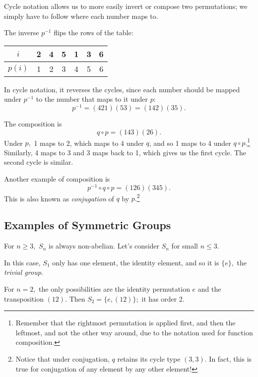 Cycle notation allows us to more easily invert or compose two permutations; we simply have to follow where each number maps to.

\begin{example}[Inversion]
The inverse $p^{-1}$ flips the rows of the table:
\begin{center}
    \begin{tabular}{c|c c c c c c}
     $i$ & 2 & 4 & 5 & 1 & 3 & 6 \\
     \hline
     $p(i)$ & 1 & 2 & 3 & 4 & 5 & 6
\end{tabular}
\end{center}

In cycle notation, it reverses the cycles, since each number should be mapped under $p^{-1}$ to the number that maps to it under $p$:
\[
p^{-1} = (421)(53) = (142)(35).
\]
\end{example}

\begin{example}[Composition]
The composition is
\[
q \circ p = (143)(26).
\]
Under $p,$ 1 maps to 2, which maps to 4 under $q$, and so 1 maps to 4 under $q \circ p.$\footnote{Remember that the rightmost permutation is applied first, and then the leftmost, and not the other way around, due to the notation used for function composition.} Similarly, 4 maps to 3 and 3 maps back to 1, which gives us the first cycle. The second cycle is similar.
\end{example}

\begin{example}[Conjugation]
Another example of composition is
\[
p^{-1} \circ q \circ p = (126)(345).
\]
This is also known as \emph{conjugation} of $q$ by $p.$\footnote{Notice that under conjugation, $q$ retains its cycle type $(3, 3).$ In fact, this is true for conjugation of any element by any other element!}
\end{example}

\subsection{Examples of Symmetric Groups}
For $n \geq 3,$ $S_n$ is always non-abelian. Let's consider $S_n$ for small $n \leq 3.$
\begin{example}[$S_1$]
In this case, $S_1$ only has one element, the identity element, and so it is $\{e\},$ the \emph{trivial group.}
\end{example}

\begin{example}[$S_2$]
For $n = 2,$ the only possibilities are the identity permutation $e$ and the transposition $(12).$ Then $S_2 = \{e, (12)\};$ it has order 2.
\end{example}

